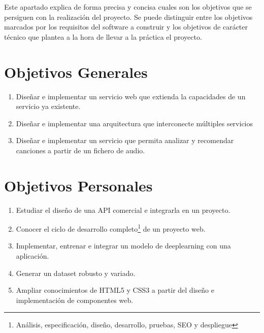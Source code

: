 
Este apartado explica de forma precisa y concisa cuales son los objetivos que se persiguen con la realización del proyecto. Se puede distinguir entre los objetivos marcados por los requisitos del software a construir y los objetivos de carácter técnico que plantea a la hora de llevar a la práctica el proyecto.

\section{Objetivos Generales}
\begin{enumerate}
    \item
        Diseñar e implementar un servicio web que extienda la capacidades de un servicio ya existente.
    \item 
        Diseñar e implementar una arquitectura que interconecte múltiples servicios
    \item
        Diseñar e implementar un servicio que permita analizar y recomendar canciones a partir de un fichero de audio.
        
    
\end{enumerate}

\section{Objetivos Personales}
\begin{enumerate}
    \item
        Estudiar el diseño de una API comercial e integrarla en un proyecto.
    \item
        Conocer el ciclo de desarrollo completo\footnote{Análisis, especificación, diseño, desarrollo, pruebas, SEO y despliegue} de un proyecto web.
    \item
        Implementar, entrenar e integrar un modelo de deeplearning  con una aplicación.
    \item
        Generar un dataset robusto y variado. 
    \item
        Ampliar conocimientos de HTML5 y CSS3 a partir del diseño e implementación de componentes web. 
\end{enumerate}

